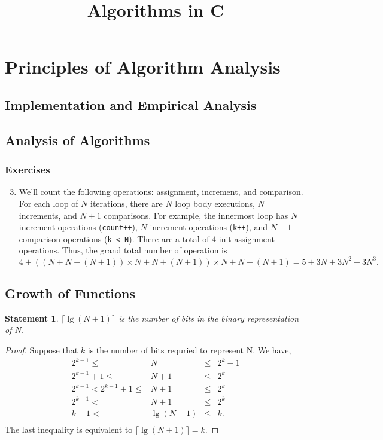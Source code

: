 \documentclass{article}
\title{Algorithms in C}
\author{}
\date{}
\newtheorem*{statement*}{Statement}
\begin{document}
\maketitle
\setcounter{section}{1}
\section{Principles of Algorithm Analysis}
\subsection{Implementation and Empirical Analysis}
\subsection{Analysis of Algorithms}
\subsubsection*{Exercises}
\begin{enumerate}[label=2.\arabic*]
	\setcounter{enumi}{2}
	\item We'll count the following operations: assignment, increment, and comparison. For each loop
	      of $N$ iterations, there are $N$ loop body executions, $N$ increments, and $N+1$
	      comparisons. For example, the innermost loop has $N$ increment operations
	      (\texttt{count++}), $N$ increment operations (\texttt{k++}), and $N+1$ comparison operations
	      (\texttt{k < N}). There are a total of 4 init assignment operations. Thus, the grand total
	      number of operation is
	      \[4 + \left(\left(N+N+(N+1)\right) \times N+N+(N+1)\right) \times N+N+(N+1)
		      = 5 + 3N + 3N^2 + 3N^3.\]
\end{enumerate}

\subsection{Growth of Functions}
\begin{statement*}
	$\lceil\lg(N+1)\rceil$ is the number of bits in the binary representation of $N$.
\end{statement*}
\begin{proof}
	Suppose that $k$ is the number of bits requried to represent N. We have,
	\begin{align*}
		2^{k-1} \le             & N        & \le & 2^k-1 \\
		2^{k-1}+1 \le           & N+1      & \le & 2^k   \\
		2^{k-1} < 2^{k-1}+1 \le & N+1      & \le & 2^k   \\
		2^{k-1} <               & N+1      & \le & 2^k   \\
		k-1 <                   & \lg(N+1) & \le & k.    \\
	\end{align*}
	The last inequality is equivalent to $\lceil\lg(N+1)\rceil=k$.
\end{proof}
\end{document}
